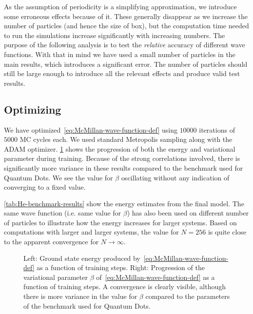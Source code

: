 \documentclass[Thesis.tex]{subfiles}
\begin{document}
\noindent As the assumption of periodicity is a simplifying approximation, we
introduce some erroneous effects because of it. These generally disappear as we
increase the number of particles (and hence the size of box), but the
computation time needed to run the simulations increase significantly with
increasing numbers. The purpose of the following analysis is to test the
\emph{relative} accuracy of different wave functions. With that in mind we have
used a small number of particles in the main results, which introduces a
significant error. The number of particles should still be large enough to
introduce all the relevant effects and produce valid test results.


\subsection{Optimizing}

We have optimized~\cref{eq:McMillan-wave-function-def} using $\num{10000}$
iterations of $\num{5000}$ MC cycles each. We used standard Metropolis sampling
along with the ADAM optimizer. \cref{fig:He-benchmark-training} shows the
progression of both the energy and variational parameter during training.
Because of the strong correlations involved, there is significantly more
variance in these results compared to the benchmark used for Quantum Dots. We
see the value for $\beta$ oscillating without any indication of converging to a
fixed value.

\cref{tab:He-benchmark-results} show the energy estimates from the final model.
The same wave function (i.e. same value for $\beta$) has also been used on
different number of particles to illustrate how the energy increases for larger
systems. Based on computations with larger and larger systems, the value for $N
= 256$ is quite close to the apparent convergence for $N\to\infty$.

\begin{figure}[h]
  \centering
  \resizebox{\linewidth}{!}{%
    
  }
  \caption{\label{fig:He-benchmark-training}Left: Ground state energy produced by~\cref{eq:McMillan-wave-function-def}
    as a function of training steps. Right: Progression of the variational
    parameter $\beta$ of~\cref{eq:McMillan-wave-function-def} as a function of
    training steps. A convergence is clearly visible, although there is more
    variance in the value for $\beta$ compared to the parameters of the
    benchmark used for Quantum Dots.}
\end{figure}
\end{document}

